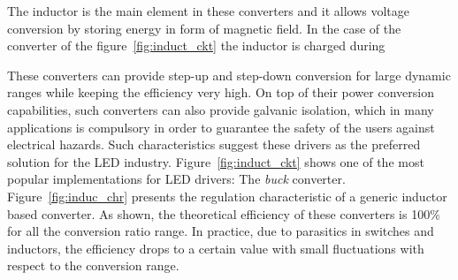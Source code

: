 The inductor is the main element in these converters and it allows voltage conversion by storing energy in form of magnetic field. In the case of the converter of the figure~\ref{fig:induct_ckt} the inductor is charged during

These converters can provide step-up and step-down conversion for large dynamic ranges while keeping the efficiency very high. On top of their power conversion capabilities, such converters can also provide galvanic isolation, which in many applications is compulsory in order to guarantee the safety of the users against electrical hazards. Such characteristics suggest these drivers as the preferred solution for the LED industry. Figure~\ref{fig:induct_ckt} shows one of the most popular implementations for LED drivers: The \emph{buck} converter.  Figure~\ref{fig:induc_chr} presents the regulation characteristic of a generic  inductor based converter. As shown, the theoretical efficiency of these converters is 100\% for all the conversion ratio range. In practice, due to parasitics in switches and inductors, the efficiency drops to a certain value with small fluctuations with respect to the conversion range.

